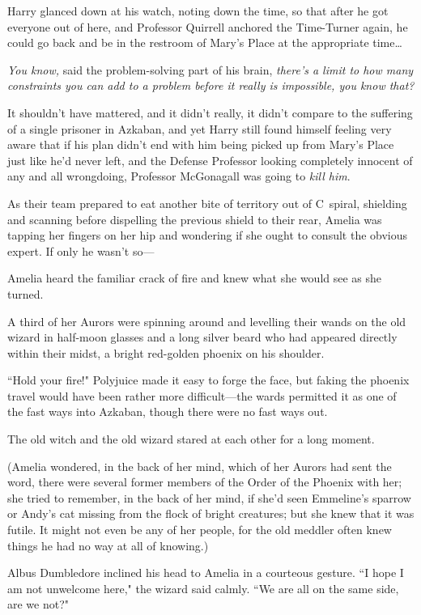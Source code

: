 Harry glanced down at his watch, noting down the time, so that after he got everyone out of here, and Professor Quirrell anchored the Time-Turner again, he could go back and be in the restroom of Mary's Place at the appropriate time{\ldots}

\emph{You know,} said the problem-solving part of his brain, \emph{there's a limit to how many constraints you can add to a problem before it \emph{really is} impossible, you know that?}

It shouldn't have mattered, and it didn't really, it didn't compare to the suffering of a single prisoner in Azkaban, and yet Harry still found himself feeling very aware that if his plan didn't end with him being picked up from Mary's Place just like he'd never left, and the Defense Professor looking completely innocent of any and all wrongdoing, Professor McGonagall was going to \emph{kill him}.

\later

As their team prepared to eat another bite of territory out of C~spiral, shielding and scanning before dispelling the previous shield to their rear, Amelia was tapping her fingers on her hip and wondering if she ought to consult the obvious expert. If only he wasn't so---

Amelia heard the familiar crack of fire and knew what she would see as she turned.

A third of her Aurors were spinning around and levelling their wands on the old wizard in half-moon glasses and a long silver beard who had appeared directly within their midst, a bright red-golden phoenix on his shoulder.

``Hold your fire!" Polyjuice made it easy to forge the face, but faking the phoenix travel would have been rather more difficult---the wards permitted it as one of the fast ways into Azkaban, though there were no fast ways out.

The old witch and the old wizard stared at each other for a long moment.

(Amelia wondered, in the back of her mind, which of her Aurors had sent the word, there were several former members of the Order of the Phoenix with her; she tried to remember, in the back of her mind, if she'd seen Emmeline's sparrow or Andy's cat missing from the flock of bright creatures; but she knew that it was futile. It might not even be any of her people, for the old meddler often knew things he had no way at all of knowing.)

Albus Dumbledore inclined his head to Amelia in a courteous gesture. ``I hope I am not unwelcome here," the wizard said calmly. ``We are all on the same side, are we not?"

